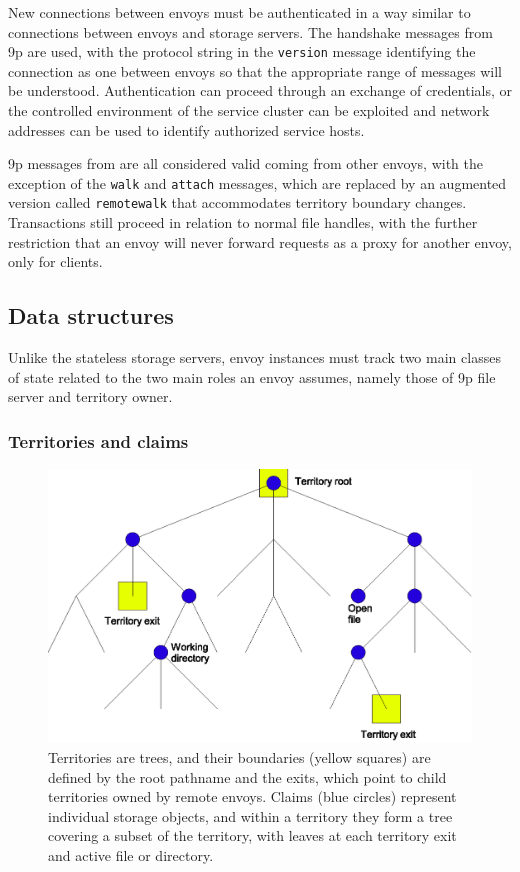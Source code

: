 New connections between envoys must be authenticated in a way similar to connections between envoys and storage servers. The handshake messages from 9p are used, with the protocol string in the \texttt{version} message identifying the connection as one between envoys so that the appropriate range of messages will be understood. Authentication can proceed through an exchange of credentials, or the controlled environment of the service cluster can be exploited and network addresses can be used to identify authorized service hosts.

9p messages from  are all considered valid coming from other envoys, with the exception of the \texttt{walk} and \texttt{attach} messages, which are replaced by an augmented version called \texttt{remotewalk} that accommodates territory boundary changes. Transactions still proceed in relation to normal file handles, with the further restriction that an envoy will never forward requests as a proxy for another envoy, only for clients.

\subsection{Data structures}

Unlike the stateless storage servers, envoy instances must track two main classes of state related to the two main roles an envoy assumes, namely those of 9p file server and territory owner.

\subsubsection{Territories and claims}

\begin{figure}[tp]
\centering
\includegraphics[width=.8\textwidth]{figures/territory-claims}
\caption[A territory managed by a single envoy]{Territories are trees, and their boundaries (yellow squares) are defined by the root pathname and the exits, which point to child territories owned by remote envoys. Claims (blue circles) represent individual storage objects, and within a territory they form a tree covering a subset of the territory, with leaves at each territory exit and active file or directory.}
\label{fig:territory-claims}
\end{figure}

